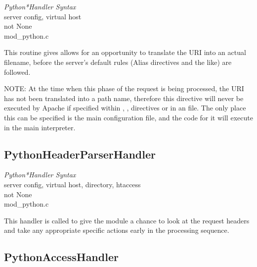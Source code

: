 \emph{Python*Handler Syntax}\\
server config, virtual host\\
not None\\
mod_python.c

This routine gives allows for an opportunity to translate the URI into
an actual filename, before the server's default rules (Alias
directives and the like) are followed.

NOTE: At the time when this phase of the request is being processed,
the URI has not been translated into a path name, therefore this
directive will never be executed by Apache if specified within
, ,  directives or in
an  file. The only place this can be specified is the
main configuration file, and the code for it will execute in the
main interpreter.

\subsection{PythonHeaderParserHandler\label{dir-handlers-hph}}

\emph{Python*Handler Syntax}\\
server config, virtual host, directory, htaccess\\
not None\\
mod_python.c

This handler is called to give the module a chance to look at the
request headers and take any appropriate specific actions early in the
processing sequence.

\subsection{PythonAccessHandler\label{dir-handlers-ach}}

